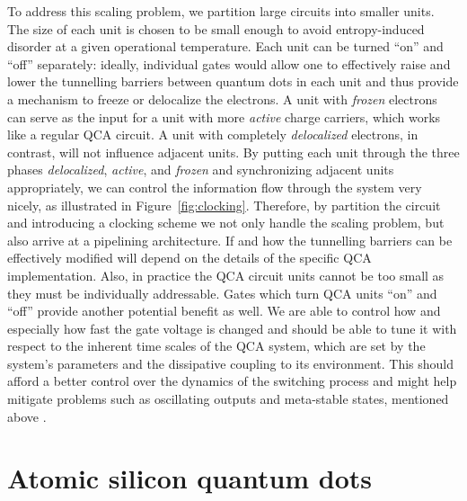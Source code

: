 To address this scaling problem, we partition large circuits into smaller units.
The size of each unit is chosen to be small enough to avoid entropy-induced
disorder at a given operational temperature. Each unit can be turned ``on'' and
``off'' separately: ideally, individual gates would allow one to effectively
raise and lower the tunnelling barriers between quantum dots in each unit and
thus provide a mechanism to freeze or delocalize the electrons. A unit with
\emph{frozen} electrons can serve as the input for a unit with more
\emph{active} charge carriers, which works like a regular QCA circuit. A unit
with completely \emph{delocalized} electrons, in contrast, will not influence
adjacent units. By putting each unit through the three phases
\emph{delocalized}, \emph{active}, and \emph{frozen} and synchronizing adjacent
units appropriately, we can control the information flow through the system very
nicely, as illustrated in Figure~\ref{fig:clocking}. Therefore, by partition
the circuit and introducing a clocking scheme we not only handle the scaling
problem, but also arrive at a pipelining architecture. If and how the
tunnelling barriers can be effectively modified will depend on the details of
the specific QCA implementation. Also, in practice the QCA circuit units cannot
be too small as they must be individually addressable. Gates which turn QCA
units ``on'' and ``off'' provide another potential benefit as well. We are able
to control how and especially how fast the gate voltage is changed and should be
able to tune it with respect to the inherent time scales of the QCA system,
which are set by the system's parameters and the dissipative coupling to its
environment. This should afford a better control over the dynamics of the
switching process and might help mitigate problems such as oscillating outputs
and meta-stable states, mentioned above \cite{lent1997device}.


\section{Atomic silicon quantum dots}

